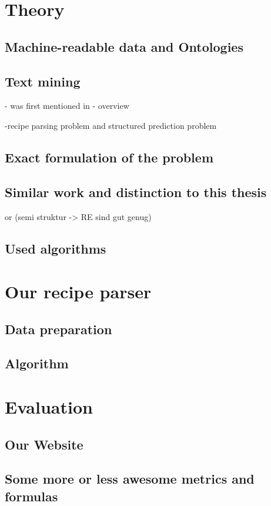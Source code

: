 \documentclass[12pt, twoside]{report}
\begin{document}
\chapter{Theory}
\section{Machine-readable data and Ontologies}
\section{Text mining}
- was first mentioned in \parencite{KDT}
- overview \parencite{surveyOfTextMining}

-recipe parsing problem and structured prediction problem 

\section{Exact formulation of the problem}
\section{Similar work and distinction to this thesis}
\cite{ingredientNetworks} or \cite{recipeRecommendation} (semi struktur -> RE sind gut genug)
\section{Used algorithms}


\chapter{Our recipe parser}
\section{Data preparation}
\section{Algorithm}

\chapter{Evaluation}
\section{Our Website}
\section{Some more or less awesome metrics and formulas}
\end{document}
